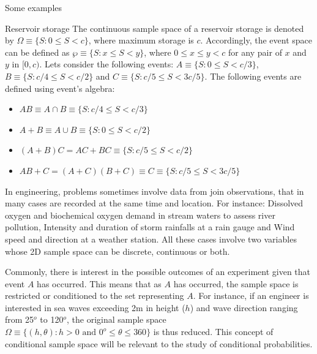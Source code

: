 \documentclass[8pt]{beamer}
\renewcommand{\emph}[1]{\textcolor{myorange}{#1}}
\begin{document}
\begin{frame}{Some examples}

    \begin{exampleblock}{Reservoir storage}
        The continuous sample space of a reservoir storage is denoted by $\Omega \equiv \{ S: 0 \leq S < c \}$, where maximum storage is $c$. Accordingly, the event space can be defined as $\wp \equiv \{ S: x \leq S < y \}$, where $0 \leq x \leq y < c$ for any pair of $x$ and $y$ in $[0,c)$. Lets consider the following events: $A \equiv \{ S: 0 \leq S < c/3 \}$, $B \equiv \{ S: c/4 \leq S < c/2 \}$ and $C \equiv \{ S: c/5 \leq S < 3c/5 \}$. The following events are defined using event's algebra:
        \begin{itemize}
            \item $AB \equiv A \cap B \equiv \{ S: c/4 \leq S < c/3 \}$ 
            \item $A + B \equiv A \cup B \equiv \{ S: 0 \leq S < c/2 \}$ 
            \item $(A + B) C = AC + BC \equiv \{ S: c/5 \leq S < c/2 \}$ 
            \item $AB + C = (A + C) (B + C) \equiv C \equiv \{ S: c/5 \leq S < 3c/5 \}$ 
        \end{itemize}

    \end{exampleblock}
    In engineering, problems sometimes involve data from join observations, that in many cases are recorded at the same time and location. For instance: \emph{Dissolved oxygen and biochemical oxygen demand in stream waters to assess river pollution}, \emph{Intensity and duration of storm rainfalls at a rain gauge} and \emph{Wind speed and direction at a weather station}. All these cases involve two variables whose 2D sample space can be discrete, continuous or both. 

    Commonly, there is interest in the possible outcomes of an experiment given that event $A$ has occurred. This means that as $A$ has occurred, the sample space is restricted or conditioned to the set representing $A$. For instance, if an engineer is interested in sea waves exceeding 2m in height ($h$) and wave direction ranging from 25$^o$ to 120$^o$, the original sample space $\Omega \equiv \{ (h, \theta) : h > 0 \text{ and } 0^o \leq \theta \leq 360 \}$    is thus reduced. This concept of \emph{conditional sample space} will be relevant to the study of \emph{conditional probabilities}.  
\end{frame}
\end{document}
